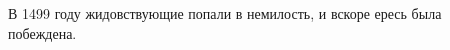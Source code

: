 \documentclass[12pt]{article}
\newcommand{\teal}[1]{\textcolor{teal}{#1}}
\begin{document}
  В 1499 году жидовствующие попали в немилость, и вскоре ересь была побеждена.
\end{document}
